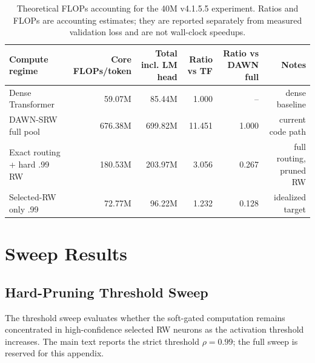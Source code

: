 \documentclass{article}
\begin{document}
\begin{table}[t]
\centering
\small
\setlength{\tabcolsep}{4pt}
\renewcommand{\arraystretch}{1.08}
\begin{tabular}{lrrrrr}
\toprule
Compute regime & Core FLOPs/token & Total incl. LM head & Ratio vs TF & Ratio vs DAWN full & Notes \\
\midrule
Dense Transformer & 59.07M & 85.44M & 1.000 & -- & dense baseline \\
DAWN-SRW full pool & 676.38M & 699.82M & 11.451 & 1.000 & current code path \\
Exact routing + hard .99 RW & 180.53M & 203.97M & 3.056 & 0.267 & full routing, pruned RW \\
Selected-RW only .99 & 72.77M & 96.22M & 1.232 & 0.128 & idealized target \\
\bottomrule
\end{tabular}
\caption{Theoretical FLOPs accounting for the 40M v4.1.5.5 experiment. Ratios and FLOPs are accounting estimates; they are reported separately from measured validation loss and are not wall-clock speedups.}
\label{tab:flops_accounting_40m}
\end{table}


\section{Sweep Results}
\label{app:exploration_sweep}


\subsection{Hard-Pruning Threshold Sweep}

The threshold sweep evaluates whether the soft-gated computation remains concentrated in high-confidence selected RW neurons as the activation threshold increases. The main text reports the strict threshold $\rho=0.99$; the full sweep is reserved for this appendix.
\end{document}
